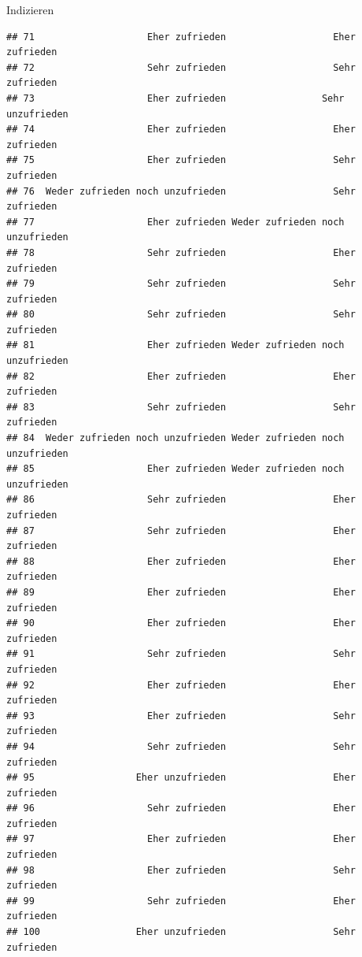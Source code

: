 \documentclass[ignorenonframetext,]{beamer}
\begin{document}
\begin{frame}[fragile]{Indizieren}
\begin{verbatim}
## 71                    Eher zufrieden                   Eher zufrieden
## 72                    Sehr zufrieden                   Sehr zufrieden
## 73                    Eher zufrieden                 Sehr unzufrieden
## 74                    Eher zufrieden                   Eher zufrieden
## 75                    Eher zufrieden                   Sehr zufrieden
## 76  Weder zufrieden noch unzufrieden                   Sehr zufrieden
## 77                    Eher zufrieden Weder zufrieden noch unzufrieden
## 78                    Sehr zufrieden                   Eher zufrieden
## 79                    Sehr zufrieden                   Sehr zufrieden
## 80                    Sehr zufrieden                   Sehr zufrieden
## 81                    Eher zufrieden Weder zufrieden noch unzufrieden
## 82                    Eher zufrieden                   Eher zufrieden
## 83                    Sehr zufrieden                   Sehr zufrieden
## 84  Weder zufrieden noch unzufrieden Weder zufrieden noch unzufrieden
## 85                    Eher zufrieden Weder zufrieden noch unzufrieden
## 86                    Sehr zufrieden                   Eher zufrieden
## 87                    Sehr zufrieden                   Eher zufrieden
## 88                    Eher zufrieden                   Eher zufrieden
## 89                    Eher zufrieden                   Eher zufrieden
## 90                    Eher zufrieden                   Eher zufrieden
## 91                    Sehr zufrieden                   Sehr zufrieden
## 92                    Eher zufrieden                   Eher zufrieden
## 93                    Eher zufrieden                   Sehr zufrieden
## 94                    Sehr zufrieden                   Sehr zufrieden
## 95                  Eher unzufrieden                   Eher zufrieden
## 96                    Sehr zufrieden                   Eher zufrieden
## 97                    Eher zufrieden                   Eher zufrieden
## 98                    Eher zufrieden                   Sehr zufrieden
## 99                    Sehr zufrieden                   Eher zufrieden
## 100                 Eher unzufrieden                   Sehr zufrieden
\end{verbatim}

\end{frame}
\end{document}
